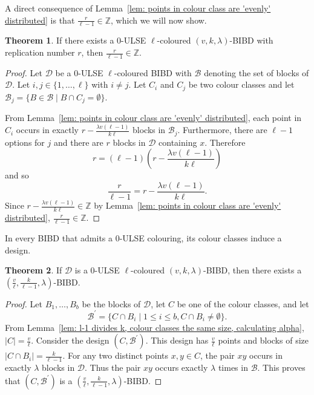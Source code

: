 \documentclass[12pt]{article}
\theoremstyle{definition}
\newtheorem{theorem}{Theorem}[section]
\begin{document}
A direct consequence of Lemma~\ref{lem: points in colour class are 'evenly' distributed} is that $\frac{r}{\ell-1}\in \mathbb{Z}$, which we will now show.

\begin{theorem}
    If there exists a $0$-ULSE $\ell$-coloured $(v,k,\lambda)$-BIBD with replication number $r$, then $\frac{r}{\ell-1}\in \mathbb{Z}$.
\end{theorem}

\begin{proof}
    Let $\mathcal{D}$ be a $0$-ULSE $\ell$-coloured BIBD with $\mathcal{B}$ denoting the set of blocks of $\mathcal{D}$. Let $i,j \in \{1,\dots, \ell\}$ with $i\neq j$. Let $C_i$ and $C_j$ be two colour classes and let $\mathcal{B}_j = \{B\in \mathcal{B} \mid B\cap C_j = \emptyset\}$.

    From Lemma~\ref{lem: points in colour class are 'evenly' distributed}, each point in $C_i$ occurs in exactly $r - \frac{\lambda v(\ell-1)}{k\ell}$ blocks in $\mathcal{B}_j$. Furthermore, there are $\ell-1$ options for $j$ and there are $r$ blocks in $\mathcal{D}$ containing $x$. Therefore \[r = (\ell-1) \left( r - \frac{\lambda v(\ell-1)}{k\ell} \right)\] and so \[\frac{r}{\ell-1} = r - \frac{\lambda v(\ell-1)}{k\ell}.\] Since $r - \frac{\lambda v(\ell-1)}{k\ell}\in \mathbb{Z}$ by Lemma~\ref{lem: points in colour class are 'evenly' distributed}, $\frac{r}{\ell-1} \in \mathbb{Z}$. 
\end{proof}

In every BIBD that admits a $0$-ULSE colouring, its colour classes induce a design.

\begin{theorem}
    If $\mathcal{D}$ is a $0$-ULSE $\ell$-coloured $(v,k,\lambda)$-BIBD, then there exists a $\left(\frac{v}{\ell}, \frac{k}{\ell-1}, \lambda\right)$-BIBD.
\end{theorem}

\begin{proof}
    Let $B_1, \dots, B_b$ be the blocks of $\mathcal{D}$, let $C$ be one of the colour classes, and let \[\mathcal{B}^\prime = \{C\cap B_i \mid 1\leq i\leq b, C\cap B_i \neq \emptyset\}.\] From Lemma~\ref{lem: l-1 divides k, colour classes the same size, calculating alpha}, $|C| = \frac{v}{\ell}$. Consider the design $(C, \mathcal{B}^\prime)$. This design has $\frac{v}{\ell}$ points and blocks of size $|C\cap B_i| = \frac{k}{\ell-1}$. For any two distinct points $x,y\in C$, the pair $xy$ occurs in exactly $\lambda$ blocks in $\mathcal{D}$. Thus the pair $xy$ occurs exactly $\lambda$ times in $\mathcal{B}$. This proves that $(C,\mathcal{B}^\prime)$ is a $\left(\frac{v}{\ell}, \frac{k}{\ell-1}, \lambda\right)$-BIBD.
\end{proof}
\end{document}
